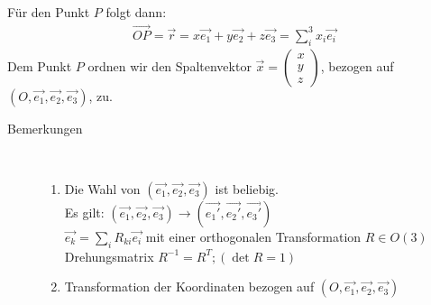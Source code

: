 Für den Punkt $P$ folgt dann:
\begin{align*}
\vec{OP}=\vec{r}=x\vec{e_1}+y\vec{e_2}+z\vec{e_3}=\sum_i^3 x_i\vec{e_i}
\end{align*}
Dem Punkt $P$ ordnen wir den Spaltenvektor $\vec{x}=\begin{pmatrix}
x \\ 
y \\ 
z
\end{pmatrix} $, bezogen auf $(O,\vec{e_1},\vec{e_2},\vec{e_3})$, zu.
\begin{description}
\item[Bemerkungen]~\par
\begin{enumerate}
\item Die Wahl von $(\vec{e_1},\vec{e_2},\vec{e_3})$ ist beliebig.\\
  Es gilt: $(\vec{e_1},\vec{e_2},\vec{e_3})\rightarrow(\vec{e_1'},\vec{e_2'},\vec{e_3'})$\\
  $\vec{e_k}=\sum_i R_{ki} \vec{e_i}$ mit einer orthogonalen
  Transformation $R\in O(3)$ Drehungsmatrix $R^{-1}=R^T; (\det R=1)$
\item Transformation der Koordinaten bezogen auf $(O,\vec{e_1},\vec{e_2},\vec{e_3})$
\end{enumerate}
\end{description}

